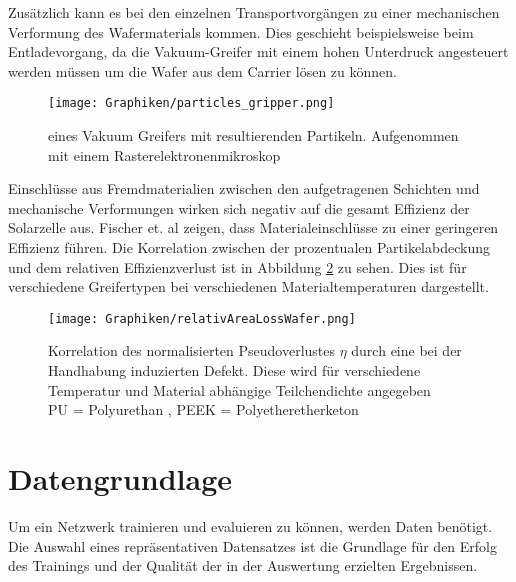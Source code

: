    Zusätzlich kann es bei den einzelnen Transportvorgängen zu einer mechanischen Verformung des Wafermaterials kommen. Dies geschieht beispielsweise beim Entladevorgang, da die Vakuum-Greifer mit einem hohen Unterdruck angesteuert werden müssen um die Wafer aus dem Carrier lösen zu können.
   

\begin{figure}[h!]
    \centering
    \texttt{[image: Graphiken/particles\_gripper.png]}
    \caption{ eines Vakuum Greifers mit resultierenden Partikeln. Aufgenommen mit einem Rasterelektronenmikroskop \cite{particle_image_Fischer2019}}
    \label{fig:particles}
\end{figure}

   Einschlüsse aus Fremdmaterialien zwischen den aufgetragenen Schichten und mechanische Verformungen wirken sich negativ auf die gesamt Effizienz der Solarzelle aus. Fischer et. al \cite{Fischer.2022} zeigen, dass Materialeinschlüsse zu einer geringeren Effizienz führen. Die Korrelation zwischen der prozentualen Partikelabdeckung und dem relativen Effizienzverlust ist in Abbildung \ref{fig:relativeAreaLossWafer} zu sehen. Dies ist für verschiedene Greifertypen bei verschiedenen Materialtemperaturen dargestellt.

\begin{figure}[h!]
    \centering
    \texttt{[image: Graphiken/relativAreaLossWafer.png]}
    \caption{Korrelation des normalisierten Pseudoverlustes $\eta$ durch eine bei der Handhabung induzierten Defekt. Diese wird für verschiedene Temperatur und Material abhängige Teilchendichte angegeben \cite{impactParticlesFischerrefId0}
    \\ PU = Polyurethan , PEEK = Polyetheretherketon}
    \label{fig:relativeAreaLossWafer}
\end{figure}
  



    
\section{Datengrundlage}
  Um ein Netzwerk trainieren und evaluieren zu können, werden Daten benötigt. Die Auswahl eines repräsentativen Datensatzes ist die Grundlage für den Erfolg des Trainings und der Qualität der in der Auswertung erzielten Ergebnissen. 
  
